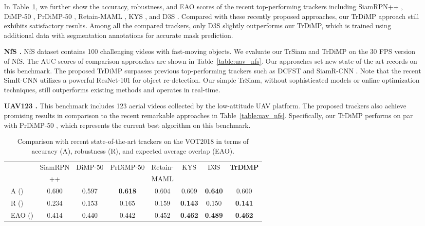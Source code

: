 \documentclass[10pt,twocolumn,letterpaper]{article}
\begin{document}
In Table~\ref{table:vot}, we further show the accuracy, robustness, and EAO scores of the recent top-performing trackers including SiamRPN++ \cite{siamrpn++}, DiMP-50 \cite{DiMP}, PrDiMP-50 \cite{PrDiMP}, Retain-MAML \cite{MAML}, KYS \cite{KYS}, and D3S \cite{D3S}.
Compared with these recently proposed approaches, our TrDiMP approach still exhibits satisfactory results.
Among all the compared trackers, only D3S slightly outperforms our TrDiMP, which is trained using additional data with segmentation annotations for accurate mask prediction.




{\noindent \bf NfS \cite{NFSdataset}.} 
NfS dataset contains 100 challenging videos with fast-moving objects.
We evaluate our TrSiam and TrDiMP on the 30 FPS version of NfS.
The AUC scores of comparison approaches are shown in Table~\ref{table:uav_nfs}. 
Our approaches set new state-of-the-art records on this benchmark. 
The proposed TrDiMP surpasses previous top-performing trackers such as DCFST \cite{DCFST} and SiamR-CNN \cite{SiamRCNN}.
Note that the recent SimR-CNN utilizes a powerful ResNet-101 for object re-detection. 
Our simple TrSiam, without sophisticated models or online optimization techniques, still outperforms existing methods and operates in real-time. 



{\noindent \bf UAV123 \cite{UAV123}.} 
This benchmark includes 123 aerial videos collected by the low-attitude UAV platform.
The proposed trackers also achieve promising results in comparison to the recent remarkable approaches in Table~\ref{table:uav_nfs}. 
Specifically, our TrDiMP performs on par with PrDiMP-50 \cite{PrDiMP}, which represents the current best algorithm on this benchmark. 




\setlength{\tabcolsep}{2pt}
\begin{table}[t]
	\scriptsize
	\begin{center}
		\caption{Comparison with recent state-of-the-art trackers on the VOT2018 \cite{VOT2018} in terms of accuracy (A), robustness (R), and expected average overlap (EAO).} \label{table:vot}	
		\begin{tabular*}{8.4 cm} {@{\extracolsep{\fill}}lccccccc}
			\hline
			~   & SiamRPN &DiMP-50 &PrDiMP-50 &Retain- &KYS &D3S  &{\bf TrDiMP} \\
			~   &++ \cite{siamrpn++} &\cite{DiMP} &\cite{PrDiMP} &MAML \cite{MAML} &\cite{KYS} &\cite{D3S}  & \\
			\hline
			~A ()       &0.600  &0.597 &{\bf \color{blue} 0.618} &0.604 &0.609 &{\bf \color{red}0.640} &0.600 \\
			~R ()       &0.234  &0.153 &0.165 &0.159 &{\bf \color{blue} 0.143} &0.150 &{\bf \color{red} 0.141} \\
			~EAO ()     &0.414  &0.440 &0.442 &0.452 &{\bf \color{blue} 0.462} &{\bf \color{red} 0.489} &{\bf \color{blue} 0.462} \\
			\hline
		\end{tabular*}
	\end{center}
	\vspace{-0.2in}
\end{table} 
\end{document}
